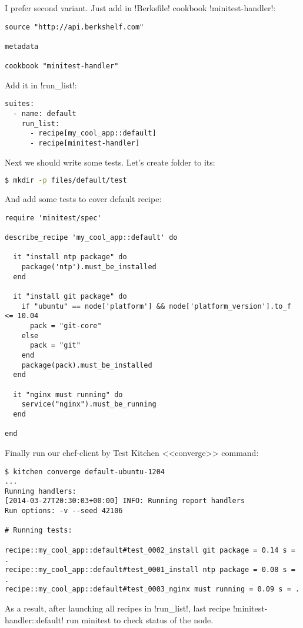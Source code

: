 I prefer second variant. Just add in \inline!Berksfile! cookbook \inline!minitest-handler!:

\begin{lstlisting}[label=lst:testing-minitest5]
source "http://api.berkshelf.com"

metadata

cookbook "minitest-handler"
\end{lstlisting}

Add it in \inline!run_list!:

\begin{lstlisting}[label=lst:testing-minitest6]
suites:
  - name: default
    run_list:
      - recipe[my_cool_app::default]
      - recipe[minitest-handler]
\end{lstlisting}

Next we should write some tests. Let's create folder to its:

\begin{lstlisting}[language=Bash,label=lst:testing-minitest7]
$ mkdir -p files/default/test
\end{lstlisting}

And add some tests to cover default recipe:

\begin{lstlisting}[label=lst:testing-minitest8,title=my-server-cloud/site-cookbooks/my\_cool\_app/files/default/test/default\_test.rb]
require 'minitest/spec'

describe_recipe 'my_cool_app::default' do

  it "install ntp package" do
    package('ntp').must_be_installed
  end

  it "install git package" do
    if "ubuntu" == node['platform'] && node['platform_version'].to_f <= 10.04
      pack = "git-core"
    else
      pack = "git"
    end
    package(pack).must_be_installed
  end

  it "nginx must running" do
    service("nginx").must_be_running
  end

end
\end{lstlisting}

Finally run our chef-client by Test Kitchen <<converge>> command:

\begin{lstlisting}[label=lst:testing-minitest9]
$ kitchen converge default-ubuntu-1204
...
Running handlers:
[2014-03-27T20:30:03+00:00] INFO: Running report handlers
Run options: -v --seed 42106

# Running tests:

recipe::my_cool_app::default#test_0002_install git package = 0.14 s = .
recipe::my_cool_app::default#test_0001_install ntp package = 0.08 s = .
recipe::my_cool_app::default#test_0003_nginx must running = 0.09 s = .
\end{lstlisting}

As a result, after launching all recipes in \inline!run_list!, last recipe \inline!minitest-handler::default! run minitest to check status of the node.
